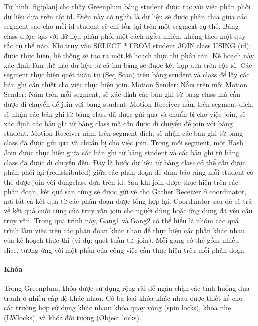 \documentclass[14pt]{article}
\begin{document}
Từ hình \ref{fig:plan} cho thấy Greenplum bảng student được tạo với việc phân phối dữ liệu dựa trên cột id. Điều này có nghĩa là dữ liệu sẽ được phân chia giữa các segment sao cho mỗi id student sẽ chỉ tồn tại trên một segment cụ thể. Bảng class được tạo với dữ liệu phân phối một cách ngẫu nhiên, không theo một quy tắc cụ thể nào. Khi truy vấn SELECT * FROM student JOIN class USING (id); được thực hiện, hệ thống sẽ tạo ra một kế hoạch thực thi phân tán. Kế hoạch này xác định làm thế nào dữ liệu từ cả hai bảng sẽ được kết hợp dựa trên cột id. Các segment thực hiện quét tuần tự (Seq Scan) trên bảng student và class để lấy các bản ghi cần thiết cho việc thực hiện join. Motion Sender: Nằm trên mỗi Motion Sender: Nằm trên mỗi segment, sẽ xác định các bản ghi từ bảng
class mà cần được di chuyển để join với bảng student.
Motion Receiver nằm trên segment đích, sẽ nhận các bản ghi từ bảng class
đã được gửi qua và chuẩn bị cho việc join, sẽ xác định các bản ghi từ bảng class mà cần được di chuyển để join với bảng student. Motion Receiver nằm trên segment đích, sẽ nhận các bản ghi từ bảng class đã được gửi qua và chuẩn bị cho việc join. Trong mỗi segment, một Hash Join được thực hiện giữa các bản ghi từ bảng student và các bản ghi từ bảng class đã được di chuyển đến. Đây là bước dữ liệu từ bảng class có thể cần được phân phối lại (redistributed) giữa các phân đoạn để đảm bảo rằng mỗi student có thể được join với đúngclass dựa trên id. Sau khi join được thực hiện trên các phân đoạn, kết quả sau cùng sẽ được gửi về cho Gather Receiver ở coordinator, nơi tất cả kết quả từ các phân đoạn được tổng hợp lại. Coordinator sau đó sẽ trả về kết quả cuối cùng của truy vấn join cho người dùng hoặc ứng dụng đã yêu cầu truy vấn. Trong quá trình này, Gang1 và Gang2 có thể hiểu là nhóm các quá trình làm việc trên các phân đoạn khác nhau để thực hiện các phần khác nhau của kế hoạch thực thi (ví dụ: quét tuần tự, join). Mỗi gang có thể gồm nhiều slice, tương ứng với một phần của công việc cần thực hiện trên mỗi phân
đoạn.

\paragraph{Khóa}

Trong Greenplum, khóa được sử dụng rộng rãi để ngăn chặn các tình huống
đua tranh ở nhiều cấp độ khác nhau. Có ba loại khóa khác nhau được thiết kế cho các trường hợp sử dụng khác nhau: khóa quay vòng (spin locks), khóa nhẹ (LWlocks), và khóa đối tượng (Object locks).
\end{document}
